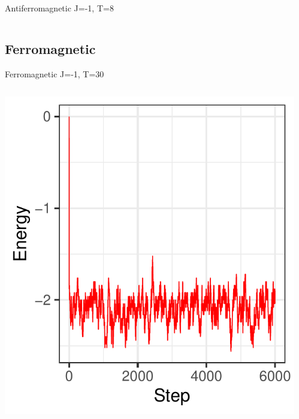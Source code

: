 \documentclass{beamer}
\begin{document}
\begin{frame}{Antiferromagnetic J=-1, T=8}
\begin{columns}
\begin{column}{0.5\textwidth}
\begin{center}
     \end{center}
\end{column}
\end{columns}
\end{frame}

\subsection{Ferromagnetic}

\begin{frame}{Ferromagnetic J=-1, T=30}
\begin{columns}
\begin{column}{0.5\textwidth}
    \begin{center}
     \includegraphics[width=\textwidth]{Pic/J-1_10_6000_T=30_ENERGY.pdf}
     \end{center}
\end{column}
\begin{column}{0.5\textwidth}
    \begin{center}

\end{center}
\end{column}
\end{columns}
\end{frame}
\end{document}
